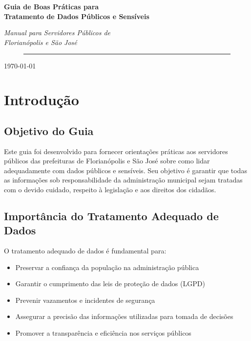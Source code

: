 \documentclass[12pt,a4paper]{article}
\begin{document}
\begin{titlepage}
    \centering
    \vspace*{2cm}
    {\Huge\bfseries Guia de Boas Práticas para\\Tratamento de Dados Públicos e Sensíveis\par}
    \vspace{2cm}
    {\Large\itshape Manual para Servidores Públicos de\\Florianópolis e São José\par}
    \vspace{4cm}
    \begin{figure}[h]
        \centering
        \rule{8cm}{4cm} %
    \end{figure}
    \vspace{3cm}
    {\large \today\par}
\end{titlepage}

\tableofcontents
\newpage

\section{Introdução}

\subsection{Objetivo do Guia}
Este guia foi desenvolvido para fornecer orientações práticas aos servidores públicos das prefeituras de Florianópolis e São José sobre como lidar adequadamente com dados públicos e sensíveis. Seu objetivo é garantir que todas as informações sob responsabilidade da administração municipal sejam tratadas com o devido cuidado, respeito à legislação e aos direitos dos cidadãos.

\subsection{Importância do Tratamento Adequado de Dados}
O tratamento adequado de dados é fundamental para:
\begin{itemize}
    \item Preservar a confiança da população na administração pública
    \item Garantir o cumprimento das leis de proteção de dados (LGPD)
    \item Prevenir vazamentos e incidentes de segurança
    \item Assegurar a precisão das informações utilizadas para tomada de decisões
    \item Promover a transparência e eficiência nos serviços públicos
\end{itemize}
\end{document}

